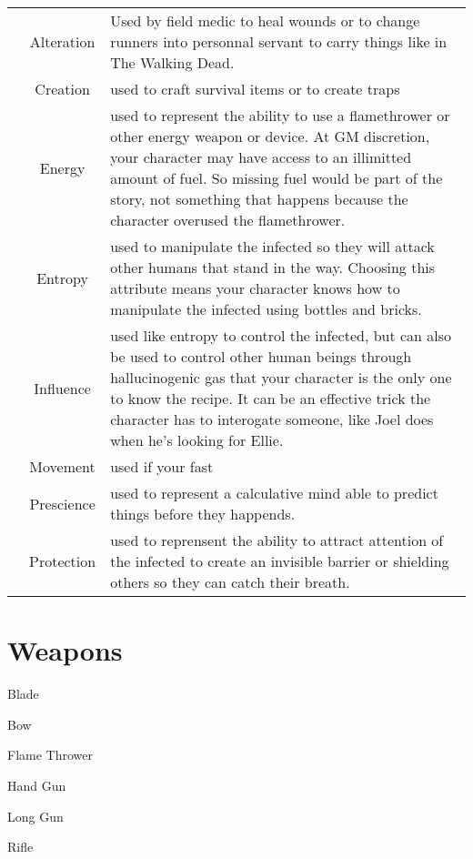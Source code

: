 \documentclass[10pt,twoside,twocolumn]{book}
\begin{document}
\begin{center}
  \begin{tabular}{ccp{150mm}}
    \rpgitem{} & Alteration & Used by field medic to heal wounds or to change runners into personnal servant to carry things
                              like in The Walking Dead. \\ 
    \rpgitem{} & Creation & used to craft survival items or to create traps \\  
    \rpgitem{} & Energy & used to represent the ability to use a flamethrower or other energy weapon or device. At GM discretion,
                          your character may have access to an illimitted amount of fuel. So missing fuel would be part of the
                          story, not something that happens because the character overused the flamethrower. \\
    \rpgitem{} & Entropy & used to manipulate the infected so they will attack other humans that stand in the way. Choosing this
                           attribute means your character knows how to manipulate the infected using bottles and bricks. \\
    \rpgitem{} & Influence & used like entropy to control the infected, but can also be used to control other human beings through
                             hallucinogenic gas that your character is the only one to know the recipe. It can be an effective trick
                             the character has to interogate someone, like Joel does when he's looking for Ellie. \\
    \rpgitem{} & Movement & used if your fast \\
    \rpgitem{} & Prescience & used to represent a calculative mind able to predict things before they happends. \\
    \rpgitem{} & Protection & used to reprensent the ability to attract attention of the infected to create an invisible barrier or
                              shielding others so they can catch their breath.
  \end{tabular}
\end{center}

\section{Weapons}

\begin{rpg-list}
  \item Blade
  \item Bow
  \item Flame Thrower
  \item Hand Gun
  \item Long Gun
  \item Rifle
\end{rpg-list}
\end{document}
